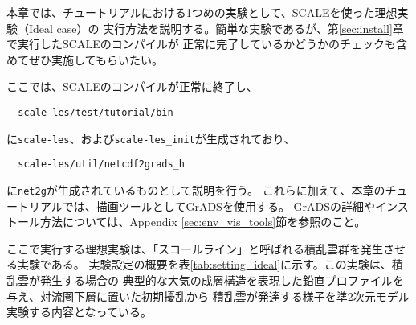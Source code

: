 
本章では、チュートリアルにおける1つめの実験として、SCALEを使った理想実験（Ideal case）の
実行方法を説明する。簡単な実験であるが、第\ref{sec:install}章で実行したSCALEのコンパイルが
正常に完了しているかどうかのチェックも含めてぜひ実施してもらいたい。


ここでは、SCALEのコンパイルが正常に終了し、
\begin{verbatim}
  scale-les/test/tutorial/bin
\end{verbatim}
に\verb|scale-les|、および\verb|scale-les_init|が生成されており、
\begin{verbatim}
  scale-les/util/netcdf2grads_h
\end{verbatim}
に\verb|net2g|が生成されているものとして説明を行う。
これらに加えて、本章のチュートリアルでは、描画ツールとしてGrADSを使用する。
GrADSの詳細やインストール方法については、Appendix \ref{sec:env_vis_tools}節を参照のこと。


ここで実行する理想実験は、「スコールライン」と呼ばれる積乱雲群を発生させる実験である。
実験設定の概要を表\ref{tab:setting_ideal}に示す。この実験は、積乱雲が発生する場合の
典型的な大気の成層構造を表現した鉛直プロファイルを与え、対流圏下層に置いた初期擾乱から
積乱雲が発達する様子を準2次元モデル実験する内容となっている。


